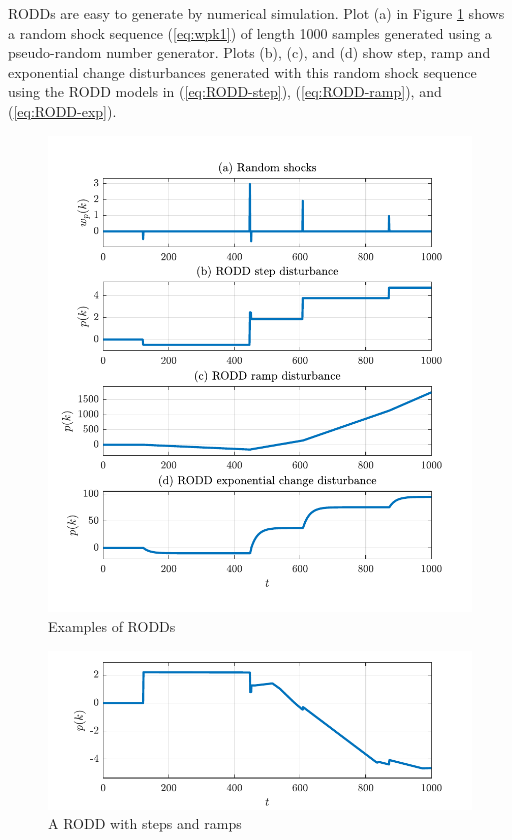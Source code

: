 RODDs are easy to generate by numerical simulation.  Plot (a) in Figure \ref{fig:rodd-sim-plots} shows a random shock sequence (\ref{eq:wpk1}) of length 1000 samples generated using a pseudo-random number generator. Plots (b), (c), and (d) show step, ramp and exponential change disturbances generated with this random shock sequence using the RODD models in (\ref{eq:RODD-step}), (\ref{eq:RODD-ramp}), and (\ref{eq:RODD-exp}). 
\begin{figure}[htp]
	\centering
	\includegraphics[width=13cm]{images/rodd_sim_plots.pdf}
	\caption{Examples of RODDs}
	\label{fig:rodd-sim-plots}
\end{figure}
\begin{figure}[htp]
	\centering
	\includegraphics[width=13cm]{images/rodd_sim_plot2.pdf}
	\caption{A RODD with steps and ramps}
	\label{fig:rodd-sim-plot2}
\end{figure}


